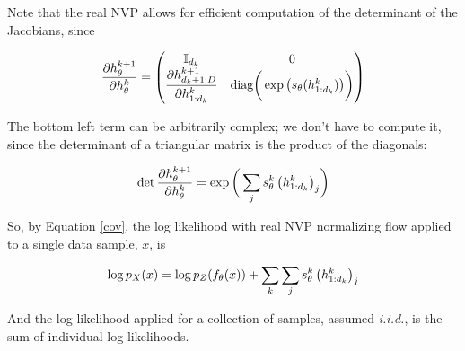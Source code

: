 \documentclass[10pt]{beamer}
\newcommand{\I}{\mathbb{I}}
\begin{document}
\begin{frame}
Note that the real NVP allows for efficient computation of the determinant of the Jacobians, since 

\[ \df{\partial h_\theta^{k+1}}{\partial h_\theta^{k}} = 
	\begin{pmatrix}
	\I_{d_k} & 0\\ 
	\df{\partial h_{d_k+1:D}^{k+1}}{\partial h_{1:d_k}^{k}} & \text{diag} \bigg( \exp \big( s_\theta (h^k_{1:d_k}) \big) \bigg) 
	\end{pmatrix}
\]

The bottom left term can be arbitrarily complex; we don't have to compute it, since the determinant of a triangular matrix is the product of the diagonals:

\[ \det \displaystyle\frac{\partial h_\theta^{k+1}}{\partial h_\theta^{k}} = \exp \bigg( \displaystyle\sum_j s_\theta^k \, \big( h^k_{1:d_k} \big)_j \bigg) \] 
\end{frame}

%

\begin{frame}
So, by Equation \ref{cov}, the log likelihood with real NVP normalizing flow applied to a single data sample, $x$, is

\[ \log p_X(x) = \log p_Z( f_\theta(x) ) + \displaystyle\sum_k \displaystyle\sum_j s_\theta^k \, \big( h^k_{1:d_k} \big)_j \] 


And the log likelihood applied for a collection of samples, assumed \textit{i.i.d.}, is the sum of individual log likelihoods. 
\end{frame}
 
\end{document}
